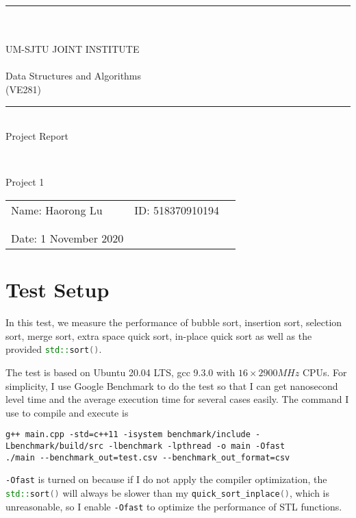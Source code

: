 \documentclass[14pt]{article}
\renewcommand\thesection{\Roman{section}}
\begin{document}
\renewcommand\thesection{\arabic{section}} 
\begin{large}
	\begin{center}
		\rule[-1pt]{10.3cm}{0.05em} \\~\\UM-SJTU JOINT INSTITUTE\\~\\Data Structures and Algorithms\\(VE281)
		~\\  \rule[-1pt]{10.3cm}{0.05em} \vspace{7cm} \\Project Report
	\end{center}
\end{large}
~\\
\begin{normalsize}
	\begin{center}
		Project 1
	\end{center}
\end{normalsize}
\vspace{4cm}
\begin{tabular}{l l l}
	Name: Haorong Lu&ID: 518370910194\\
	&&\\
	&&\\
	Date: 1 November 2020&&\\
\end{tabular}
\newpage

\section{Test Setup}
In this test, we measure the performance of bubble sort, insertion sort, selection sort, merge sort, extra space quick sort,
in-place quick sort as well as the provided \lstinline[language=c++]|std::sort()|.

The test is based on Ubuntu 20.04 LTS, gcc 9.3.0 with $16 \times 2900 MHz$ CPUs. For simplicity, 
I use Google Benchmark to do the test so that I can get nanosecond level time and the 
average execution time for several cases easily. The command I use to compile and execute is 

\begin{verbatim}
g++ main.cpp -std=c++11 -isystem benchmark/include -Lbenchmark/build/src -lbenchmark -lpthread -o main -Ofast
./main --benchmark_out=test.csv --benchmark_out_format=csv
\end{verbatim}

\lstinline[language=bash]|-Ofast| is turned on because if I do not apply the compiler optimization, the \lstinline[language=c++]|std::sort()| will always
be slower than my \lstinline[language=c++]|quick_sort_inplace()|, which is unreasonable, so I enable \lstinline[language=bash]|-Ofast| to 
optimize the performance of STL functions.
\end{document}
